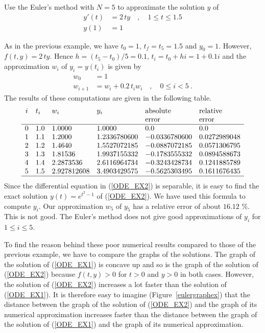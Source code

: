 \begin{egg}
Use the Euler's method with $N=5$ to approximate the solution $y$ of
\begin{equation}\label{ODE_EX2}
\begin{split}
y'(t) & =  2\,ty \quad, \quad 1 \leq t \leq 1.5 \\
y(1) & =  1
\end{split}
\end{equation}

As in the previous example, we have $t_0=1$, $t_f= t_5 =1.5$  and
$y_0=1$.  However, $f(t,y) = 2\,ty$.  Hence $h = (t_5-t_0)/5 = 0.1$,
$t_i = t_0 + hi =1 + 0.1i$ and the approximation $w_i$ of
$y_i = y(t_i)$ is given by
\begin{align*}
w_0 & = 1 \\
w_{i+1} & = w_i + 0.2\,t_i w_i \quad, \quad 0 \leq i < 5 \ .
\end{align*}
The results of these computations are given in the following table.
\[
\begin{array}{clllll}
i & t_i & w_i & y_i & \text{absolute} & \text{relative} \\
 & & & & \text{error} & \text{error} \\
\hline
0 & 1.0 & 1.0000 & 1.0000 & 0.0 & 0.0 \\
1 & 1.1 & 1.2000 & 1.2336780600 & -0.0336780600 & 0.0272989048 \\
2 & 1.2 & 1.4640 & 1.5527072185 & -0.0887072185 & 0.0571306795 \\
3 & 1.3 & 1.81536 & 1.9937155332 & -0.1783555332 & 0.0894588673 \\
4 & 1.4 & 2.2873536 & 2.6116964734 & -0.3243428734 & 0.1241885789 \\
5 & 1.5 & 2.927812608 & 3.4903429575 & -0.5625303495 & 0.1611676435 \\
\hline
\end{array}
\]
Since the differential equation in (\ref{ODE_EX2}) is separable, it is
easy to find the exact solution $y(t) = e^{t^2 -1}$ of
(\ref{ODE_EX2}).  We have used this formula to compute $y_i$.
Our approximation $w_5$ of $y_5$ has a relative error of about $16.12$ \%.
This is not good.  The Euler's method does not give good
approximations of $y_i$ for $1 \leq i \leq 5$.

To find the reason behind these poor numerical results compared to those
of the previous example, we have to compare the graphs of the
solutions.  The graph of the solution of (\ref{ODE_EX1}) is concave
up and so is the graph of the solution of (\ref{ODE_EX2})
because $f(t,y) >0$ for $t>0$ and $y>0$ in both cases.  However,
the solution of (\ref{ODE_EX2}) increases a lot faster than the
solution of (\ref{ODE_EX1}).  It is therefore easy to imagine
(Figure~\ref{eulergraphex}) that the distance between the graph of the
solution of (\ref{ODE_EX2}) and the graph of its numerical
approximation increases faster than the distance
between the graph of the solution of (\ref{ODE_EX1}) and the graph of
its numerical approximation.
\label{Euler_EX2}
\end{egg}

